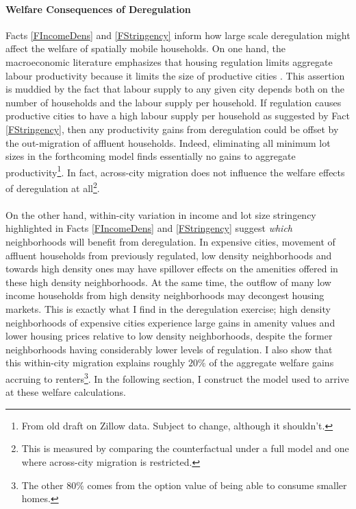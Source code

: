 \documentclass[]{article}
\begin{document}
	\paragraph*{Welfare Consequences of Deregulation} Facts \ref{FIncomeDens} and \ref{FStringency} inform how large scale deregulation might affect the welfare of spatially mobile households. On one hand, the macroeconomic literature emphasizes that housing regulation limits aggregate labour productivity because it limits the size of productive cities \citep{hseihmoretti, durantonpugaurbgrowth}. This assertion is muddied by the fact that labour supply to any given city depends both on the number of households and the labour supply per household. If regulation causes productive cities to have a high labour supply per household as suggested by Fact \ref{FStringency}, then any productivity gains from deregulation could be offset by the out-migration of affluent households. Indeed, eliminating all minimum lot sizes in the forthcoming model finds essentially no gains to aggregate productivity\footnote{From old draft on Zillow data. Subject to change, although it shouldn't.}. In fact, across-city migration does not influence the welfare effects of deregulation at all\footnote{This is measured by comparing the counterfactual under a full model and one where across-city migration is restricted.}.
	
	\paragraph{}
	On the other hand, within-city variation in income and lot size stringency highlighted in Facts \ref{FIncomeDens} and \ref{FStringency} suggest \textit{which} neighborhoods will benefit from deregulation. In expensive cities, movement of affluent households from previously regulated, low density neighborhoods and towards high density ones may have spillover effects on the amenities offered in these high density neighborhoods. At the same time, the outflow of many low income households from high density neighborhoods may decongest housing markets. This is exactly what I find in the deregulation exercise; high density neighborhoods of expensive cities experience large gains in amenity values and lower housing prices relative to low density neighborhoods, despite the former neighborhoods having considerably lower levels of regulation. I also show that this within-city migration explains roughly $20\%$ of the aggregate welfare gains accruing to renters\footnote{The other $80\%$ comes from the option value of being able to consume smaller homes.}. In the following section, I construct the model used to arrive at these welfare calculations.
\end{document}
